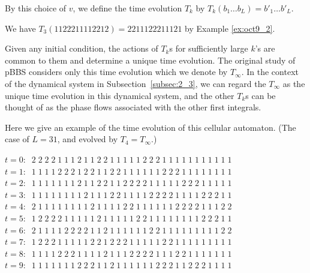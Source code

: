 By this choice of $v$, we def\/ine the time evolution $T_k$ by
$T_k (b_1 \dots b_L) = b'_1 \dots  b'_L$.
\begin{example}
We have
$T_3 (1122211112212) = 2211122211121$ by Example \ref{ex:oct9_2}.
\end{example}

\begin{remark}\label{rem:may19_1}
Given any initial condition,
the actions of $T_k$s for suf\/f\/iciently large $k$'s are common to them and determine a unique time evolution.
The original study of pBBS \cite{YT, YYT} considers only this time evolution which we denote by $T_\infty$.
{In the context of the dynamical system in Subsection~\ref{subsec:2_3},
we can regard the $T_\infty$ as the unique time evolution in this dynamical system, and the other $T_k$s can be thought of as the phase f\/lows
associated with the other f\/irst integrals.}
\end{remark}


Here we give an example of the time evolution of this cellular automaton. (The case of $L=31$, and evolved by $T_4=T_\infty$.)

\begin{center}
$t=0: \;\;2\; 2\; 2\; 2\; 1\; 1\; 1\; 2\; 1\; 1\; 2\; 2\; 1\; 1\; 1\; 1\; 1\; 2\; 2\; 2\; 1\; 1\; 1\; 1\; 1\; 1\; 1\; 1\; 1\; 1\; 1$\\
$t=1: \;\;1\; 1\; 1\; 1\; 2\; 2\; 2\; 1\; 2\; 2\; 1\; 1\; 2\; 2\; 1\; 1\; 1\; 1\; 1\; 1\; 2\; 2\; 2\; 1\; 1\; 1\; 1\; 1\; 1\; 1\; 1$\\
$t=2: \;\;1\; 1\; 1\; 1\; 1\; 1\; 1\; 2\; 1\; 1\; 2\; 2\; 1\; 1\; 2\; 2\; 2\; 2\; 1\; 1\; 1\; 1\; 1\; 2\; 2\; 2\; 1\; 1\; 1\; 1\; 1$\\
$t=3: \;\;1\; 1\; 1\; 1\; 1\; 1\; 1\; 1\; 2\; 1\; 1\; 1\; 2\; 2\; 1\; 1\; 1\; 1\; 2\; 2\; 2\; 2\; 1\; 1\; 1\; 1\; 2\; 2\; 2\; 1\; 1$\\
$t=4: \;\;2\; 1\; 1\; 1\; 1\; 1\; 1\; 1\; 1\; 2\; 1\; 1\; 1\; 1\; 2\; 2\; 1\; 1\; 1\; 1\; 1\; 1\; 2\; 2\; 2\; 2\; 1\; 1\; 1\; 2\; 2$\\
$t=5: \;\;1\; 2\; 2\; 2\; 2\; 1\; 1\; 1\; 1\; 1\; 2\; 1\; 1\; 1\; 1\; 1\; 2\; 2\; 1\; 1\; 1\; 1\; 1\; 1\; 1\; 1\; 2\; 2\; 2\; 1\; 1$\\
$t=6: \;\;2\; 1\; 1\; 1\; 1\; 2\; 2\; 2\; 2\; 1\; 1\; 2\; 1\; 1\; 1\; 1\; 1\; 1\; 2\; 2\; 1\; 1\; 1\; 1\; 1\; 1\; 1\; 1\; 1\; 2\; 2$\\
$t=7: \;\;1\; 2\; 2\; 2\; 1\; 1\; 1\; 1\; 1\; 2\; 2\; 1\; 2\; 2\; 2\; 1\; 1\; 1\; 1\; 1\; 2\; 2\; 1\; 1\; 1\; 1\; 1\; 1\; 1\; 1\; 1$\\
$t=8: \;\;1\; 1\; 1\; 1\; 2\; 2\; 2\; 1\; 1\; 1\; 1\; 2\; 1\; 1\; 1\; 2\; 2\; 2\; 2\; 1\; 1\; 1\; 2\; 2\; 1\; 1\; 1\; 1\; 1\; 1\; 1$\\
$t=9: \;\;1\; 1\; 1\; 1\; 1\; 1\; 1\; 2\; 2\; 2\; 1\; 1\; 2\; 1\; 1\; 1\; 1\; 1\; 1\; 2\; 2\; 2\; 1\; 1\; 2\; 2\; 2\; 1\; 1\; 1\; 1$
\end{center}

